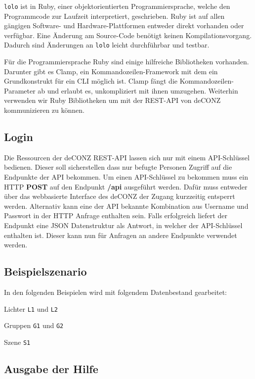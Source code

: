 \documentclass[a4paper,12pt]{article}
\begin{document}
\texttt{lolo} ist in Ruby, einer objektorientierten Programmiersprache, welche den
Programmcode zur Laufzeit interpretiert, geschrieben. Ruby ist auf allen
gängigen Software- und Hardware-Plattformen entweder direkt vorhanden oder
verfügbar. Eine Änderung am Source-Code benötigt keinen Kompilationsvorgang.
Dadurch sind Änderungen an \texttt{lolo} leicht durchführbar und testbar.

Für die Programmiersprache Ruby sind einige hilfreiche Bibliotheken vorhanden.
Darunter gibt es Clamp, ein Kommandozeilen-Framework mit dem ein Grundkonstrukt
für ein CLI möglich ist. Clamp fängt die Kommandozeilen-Parameter ab und
erlaubt es, unkompliziert mit ihnen umzugehen. Weiterhin verwenden wir Ruby
Bibliotheken um mit der REST-API von deCONZ kommunizieren zu können.

\subsection{Login}

Die Ressourcen der deCONZ REST-API lassen sich nur mit einem API-Schlüssel
bedienen. Dieser soll sicherstellen dass nur befugte Personen Zugriff auf die
Endpunkte der API bekommen. Um einen API-Schlüssel zu bekommen muss ein HTTP
\textbf{POST} auf den Endpunkt \textbf{/api} ausgeführt werden. Dafür muss
entweder über das webbasierte Interface des deCONZ der Zugang kurzzeitig
entsperrt werden. Alternativ kann eine der API bekannte Kombination aus
Username und Passwort in der HTTP Anfrage enthalten sein. Falls erfolgreich
liefert der Endpunkt eine JSON Datenstruktur als Antwort, in welcher der
API-Schlüssel enthalten ist. Dieser kann nun für Anfragen an andere Endpunkte
verwendet werden.

\subsection{Beispielszenario}

In den folgenden Beispielen wird mit folgendem Datenbestand gearbeitet:

\noindent
Lichter \texttt{L1} und \texttt{L2}

\noindent
Gruppen \texttt{G1} und \texttt{G2}

\noindent
Szene \texttt{S1}

\subsection{Ausgabe der Hilfe}
\end{document}

